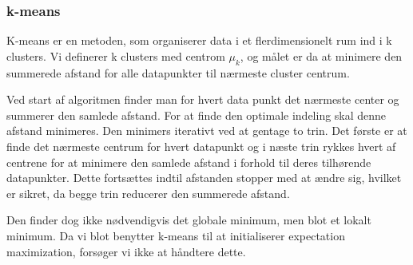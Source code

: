 \subsubsection{k-means}

K-means er en metoden, som organiserer data i et flerdimensionelt rum ind i k
clusters. Vi definerer k clusters med centrom $\mu_k$, og målet er da at
minimere den summerede afstand for alle datapunkter til nærmeste cluster
centrum. 

Ved start af algoritmen finder man for hvert data punkt det nærmeste center
og summerer den samlede afstand. For at finde den optimale indeling skal
denne afstand minimeres. Den minimers iterativt ved at gentage to trin. Det
første er at finde det nærmeste centrum for hvert datapunkt og i næste trin
rykkes hvert af centrene for at minimere den samlede afstand i forhold til
deres tilhørende datapunkter. Dette fortsættes indtil afstanden stopper med
at ændre sig, hvilket er sikret, da begge trin reducerer den summerede
afstand. 

Den finder dog ikke nødvendigvis det globale minimum, men blot et
lokalt minimum. Da vi blot benytter k-means til at initialiserer expectation
maximization, forsøger vi ikke at håndtere dette.





